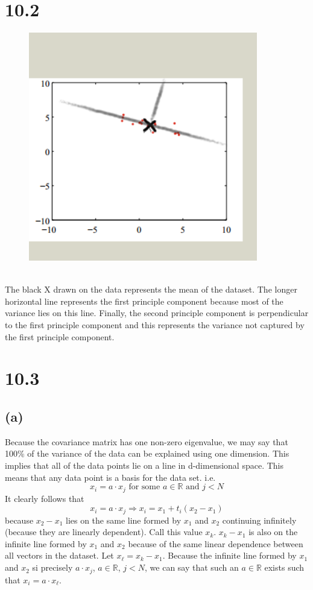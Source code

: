 \documentclass[11pt]{article}
\begin{document}
\section*{10.2}
\begin{figure}[h!]
	\centering
	\includegraphics[width=100mm]{10_2.png}
\end{figure}
\ \\
The black X drawn on the data represents the mean of the dataset. The longer horizontal line represents the first principle component because most of the variance lies on this line. Finally, the second principle component is perpendicular to the first principle component and this represents the variance not captured by the first principle component.
\clearpage
\section*{10.3}
\subsection*{(a)}
Because the covariance matrix has one non-zero eigenvalue, we may say that 100\% of the variance of the data can be explained using one dimension. This implies that all of the data points lie on a line in d-dimensional space. This means that any data point is a basis for the data set. i.e.
\[x_i=a\cdot x_j\text{ for some }a\in\mathbb{R}\text{ and }j<N\]
It clearly follows that
\[x_i=a\cdot x_j\Rightarrow x_i = x_1 + t_i(x_2-x_1)\]
because $x_2-x_1$ lies on the same line formed by $x_1$ and $x_2$ continuing infinitely (because they are linearly dependent). Call this value $x_k$. $x_k-x_1$ is also on the infinite line formed by $x_1$ and $x_2$ because of the same linear dependence between all vectors in the dataset. Let $x_\ell=x_k-x_1$. Because the infinite line formed by $x_1$ and $x_2$ si precisely $a\cdot x_j$, $a\in\mathbb{R}$, $j<N$, we can say that such an $a\in\mathbb{R}$ exists such that $x_i=a\cdot x_\ell$.
\end{document}
